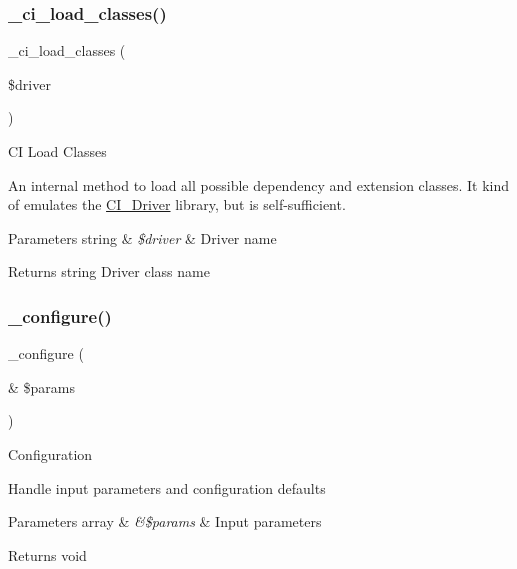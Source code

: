 \subsubsection{\texorpdfstring{\+\_\+ci\+\_\+load\+\_\+classes()}{\_ci\_load\_classes()}}
{\footnotesize\ttfamily \+\_\+ci\+\_\+load\+\_\+classes (\begin{DoxyParamCaption}\item[{}]{\$driver }\end{DoxyParamCaption})\hspace{0.3cm}{\ttfamily [protected]}}

CI Load Classes

An internal method to load all possible dependency and extension classes. It kind of emulates the \mbox{\hyperlink{class_c_i___driver}{C\+I\+\_\+\+Driver}} library, but is self-\/sufficient.


\begin{DoxyParams}[1]{Parameters}
string & {\em \$driver} & Driver name \\
\hline
\end{DoxyParams}
\begin{DoxyReturn}{Returns}
string Driver class name 
\end{DoxyReturn}
\mbox{\label{class_c_i___session_a71e7f49b0627505b4a7dbc8ce368279b}} 
\subsubsection{\texorpdfstring{\+\_\+configure()}{\_configure()}}
{\footnotesize\ttfamily \+\_\+configure (\begin{DoxyParamCaption}\item[{\&}]{\$params }\end{DoxyParamCaption})\hspace{0.3cm}{\ttfamily [protected]}}

Configuration

Handle input parameters and configuration defaults


\begin{DoxyParams}[1]{Parameters}
array & {\em \&\$params} & Input parameters \\
\hline
\end{DoxyParams}
\begin{DoxyReturn}{Returns}
void 
\end{DoxyReturn}
\mbox{\label{class_c_i___session_af85033c81c047ceeec26aa087d5ba459}} 
